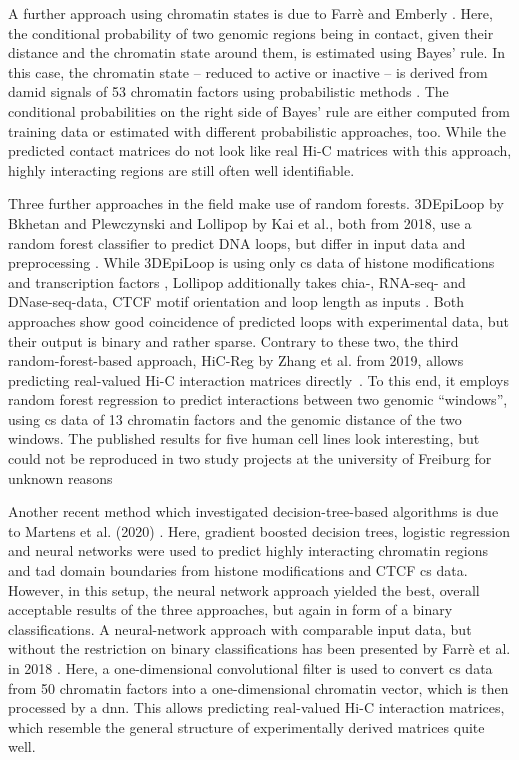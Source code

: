A further approach using chromatin states is due to Farr\`e and Emberly \cite{Farre2018}.
Here, the conditional probability of two genomic regions being in contact, given their distance and the chromatin state around them,
is estimated using Bayes' rule. 
In this case, the chromatin state -- reduced to active or inactive -- is derived from \acrfull{damid} signals of 53 chromatin factors using probabilistic methods \cite{Zhou2016}.
The conditional probabilities on the right side of Bayes' rule are either computed from training data or estimated with different probabilistic approaches, too.
While the predicted contact matrices do not look like real Hi-C matrices with this approach, highly interacting regions are still often well identifiable.

Three further approaches in the field make use of random forests. 
3DEpiLoop by Bkhetan and Plewczynski and Lollipop by Kai et al., 
both from 2018, use a random forest classifier to predict DNA loops, but differ in input data and preprocessing  \cite{Bkhetan2018, Kai2018}.
While 3DEpiLoop is using only \acrshort{cs} data of histone modifications and transcription factors \cite{Bkhetan2018},
Lollipop additionally takes \acrshort{chia}-, RNA-seq- and DNase-seq-data, CTCF motif orientation and loop length as inputs \cite{Kai2018}.
Both approaches show good coincidence of predicted loops with experimental data, but their output is binary and rather sparse.
Contrary to these two, the third random-forest-based approach, HiC-Reg by Zhang et al. from 2019, allows predicting real-valued
Hi-C interaction matrices directly~\cite{Zhang2019}. To this end, it employs random forest regression to predict interactions
between two genomic ``windows'', using \acrshort{cs} data of 13 chromatin factors and the genomic distance of the two windows.
The published results for five human cell lines look interesting, 
but could not be reproduced in two study projects at the university of Freiburg for unknown reasons~\cite{Krauth2020,Bajorat2019}

Another recent method which investigated decision-tree-based algorithms is due to Martens et al. (2020) \cite{Martens2020}.
Here, gradient boosted decision trees, logistic regression and neural networks were used to predict highly interacting chromatin regions
and \acrshort{tad} domain boundaries from histone modifications and CTCF \acrshort{cs} data. 
However, in this setup, the neural network approach yielded the best, overall acceptable results of the three approaches,
but again in form of a binary classifications.
A neural-network approach with comparable input data, but without the restriction on binary classifications has been presented by Farr\`e et al. in 2018 \cite{Farre2018a}. 
Here, a one-dimensional convolutional filter is used to convert \acrshort{cs} data from 50 chromatin factors into a 
one-dimensional chromatin vector, which is then processed by a \acrfull{dnn}.
This allows predicting real-valued Hi-C interaction matrices, which resemble the general structure of experimentally derived matrices quite well.

